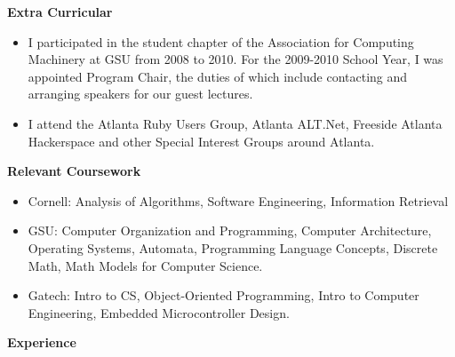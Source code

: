 \documentclass[11pt]{article}
\begin{document}
  {\large \textbf{Extra Curricular}}

  \begin{itemize}
    \item I participated in the student chapter of the Association for Computing Machinery at GSU from 2008 to 2010. For the 2009-2010 School Year, I was appointed Program Chair, the duties of which include contacting and arranging speakers for our guest lectures.
    \item I attend the Atlanta Ruby Users Group, Atlanta ALT.Net, Freeside Atlanta Hackerspace and other Special Interest Groups around Atlanta.
  \end{itemize}
  
  {\large \textbf{Relevant Coursework}}

  \begin{itemize}
    \item Cornell: Analysis of Algorithms, Software Engineering, Information Retrieval
    \item GSU: Computer Organization and Programming, Computer Architecture, Operating Systems, Automata, Programming Language Concepts, Discrete Math, Math Models for Computer Science.
    \item Gatech: Intro to CS, Object-Oriented Programming, Intro to Computer Engineering, Embedded Microcontroller Design.
  \end{itemize}

  {\large \textbf{Experience}}
\end{document}
